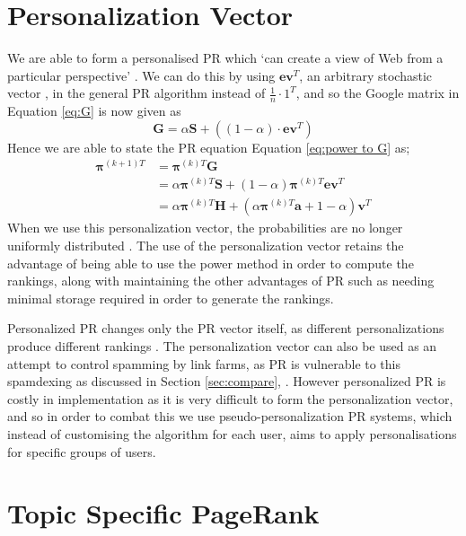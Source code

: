 \documentclass[11pt]{report}
\begin{document}
{\section{Personalization Vector} \label{sec:Personalization}

We are able to form a personalised PR which `can create a view of Web from a particular perspective' \cite{page1999pagerank}. We can do this by using $\textbf{ev}^T$, an arbitrary stochastic vector \cite{bonato}, in the general PR algorithm instead of $\frac{1}{n}\cdot1^T$, and so the Google matrix in Equation \eqref{eq:G} is now given as \begin{equation}\label{eq:Personalisation G}
\textbf{G}=\alpha\textbf{S}+\left((1-\alpha)\cdot\textbf{ev}^T\right)
\end{equation} Hence we are able to state the PR equation Equation \eqref{eq:power to G} as; 
\begin{align}
\boldsymbol{\pi}^{(k+1)T} &= \boldsymbol{\pi}^{(k)T}\textbf{G} \nonumber \\
&= \alpha\boldsymbol{\pi}^{(k)T}\textbf{S} + (1-\alpha)\boldsymbol{\pi}^{(k)T}\textbf{ev}^T \nonumber \\
&= \alpha\boldsymbol{\pi}^{(k)T}\textbf{H} + \left(\alpha\boldsymbol{\pi}^{(k)T}\textbf{a} + 1 - \alpha\right)\textbf{v}^T \label{eq:Power personalization}
\end{align}
When we use this personalization vector, the probabilities are no longer uniformly distributed \cite{langville}. The use of the personalization vector retains the advantage of being able to use the power method in order to compute the rankings, along with maintaining the other advantages of PR such as needing minimal storage required in order to generate the rankings.

Personalized PR changes only the PR vector itself, as different personalizations produce different rankings \cite{thorson2004modeling}. The personalization vector can also be used as an attempt to control spamming by link farms, as PR is vulnerable to this spamdexing as discussed in Section \ref{sec:compare}, \cite{thorson2004modeling}. However personalized PR is costly in implementation as it is very difficult to form the personalization vector, and so in order to combat this we use pseudo-personalization PR systems, which instead of customising the algorithm for each user, aims to apply personalisations for specific groups of users.

\section{Topic Specific PageRank} \label{sec:Topic specific PR}

}
\end{document}
